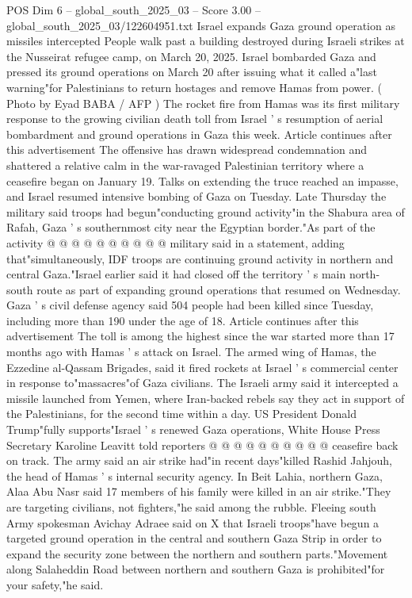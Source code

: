 \begin{textsample}{POS Dim 6 – global\_south\_2025\_03 – Score 3.00 – global\_south\_2025\_03/122604951.txt}  \label{ex:f6_pos_228}
Israel expands Gaza ground operation as missiles intercepted People walk past a building destroyed during Israeli strikes at the Nusseirat refugee camp, on March 20, 2025.
Israel bombarded Gaza and pressed its ground operations on March 20 after issuing what it called a"last warning"for Palestinians to return hostages and remove Hamas from power. ( Photo by Eyad BABA / AFP ) The rocket fire from Hamas was its first military response to the growing civilian death toll from Israel ' s resumption of aerial bombardment and ground operations in Gaza this week.
Article continues after this advertisement The offensive has drawn widespread condemnation and shattered a relative calm in the war-ravaged Palestinian territory where a ceasefire began on January 19.
Talks on extending the truce reached an impasse, and Israel resumed intensive bombing of Gaza on Tuesday.
Late Thursday the military said troops had begun"conducting ground activity"in the Shabura area of Rafah, Gaza ' s southernmost city near the Egyptian border."As part of the activity @ @ @ @ @ @ @ @ @ @ military said in a statement, adding that"simultaneously, IDF troops are continuing ground activity in northern and central Gaza."Israel earlier said it had closed off the territory ' s main north-south route as part of expanding ground operations that resumed on Wednesday.
Gaza ' s civil defense agency said 504 people had been killed since Tuesday, including more than 190 under the age of 18.
Article continues after this advertisement The toll is among the highest since the war started more than 17 months ago with Hamas ' s attack on Israel.
The armed wing of Hamas, the Ezzedine al-Qassam Brigades, said it fired rockets at Israel ' s commercial center in response to"massacres"of Gaza civilians.
The Israeli army said it intercepted a missile launched from Yemen, where Iran-backed rebels say they act in support of the Palestinians, for the second time within a day.
US President Donald Trump"fully supports"Israel ' s renewed Gaza operations, White House Press Secretary Karoline Leavitt told reporters @ @ @ @ @ @ @ @ @ @ ceasefire back on track.
The army said an air strike had"in recent days"killed Rashid Jahjouh, the head of Hamas ' s internal security agency.
In Beit Lahia, northern Gaza, Alaa Abu Nasr said 17 members of his family were killed in an air strike."They are targeting civilians, not fighters,"he said among the rubble.
Fleeing south Army spokesman Avichay Adraee said on X that Israeli troops"have begun a targeted ground operation in the central and southern Gaza Strip in order to expand the security zone between the northern and southern parts."Movement along Salaheddin Road between northern and southern Gaza is prohibited"for your safety,"he said.

\end{textsample}
